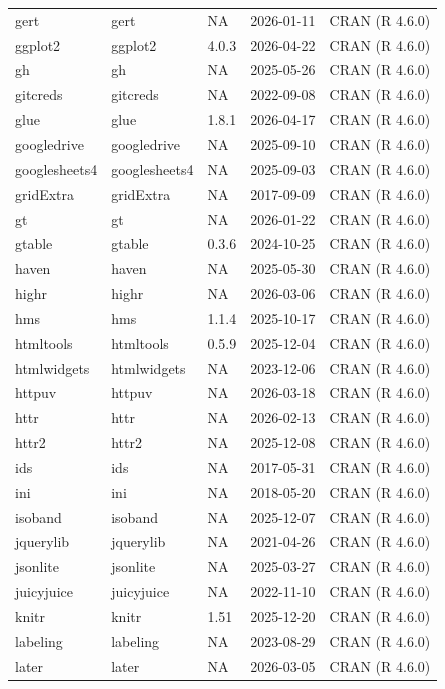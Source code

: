 \documentclass[
]{book}
\begin{document}
\begin{tabular}{lllll}
gert & gert & NA & 2026-01-11 & CRAN (R 4.6.0)\\
ggplot2 & ggplot2 & 4.0.3 & 2026-04-22 & CRAN (R 4.6.0)\\
gh & gh & NA & 2025-05-26 & CRAN (R 4.6.0)\\
\addlinespace
gitcreds & gitcreds & NA & 2022-09-08 & CRAN (R 4.6.0)\\
glue & glue & 1.8.1 & 2026-04-17 & CRAN (R 4.6.0)\\
googledrive & googledrive & NA & 2025-09-10 & CRAN (R 4.6.0)\\
googlesheets4 & googlesheets4 & NA & 2025-09-03 & CRAN (R 4.6.0)\\
gridExtra & gridExtra & NA & 2017-09-09 & CRAN (R 4.6.0)\\
\addlinespace
gt & gt & NA & 2026-01-22 & CRAN (R 4.6.0)\\
gtable & gtable & 0.3.6 & 2024-10-25 & CRAN (R 4.6.0)\\
haven & haven & NA & 2025-05-30 & CRAN (R 4.6.0)\\
highr & highr & NA & 2026-03-06 & CRAN (R 4.6.0)\\
hms & hms & 1.1.4 & 2025-10-17 & CRAN (R 4.6.0)\\
\addlinespace
htmltools & htmltools & 0.5.9 & 2025-12-04 & CRAN (R 4.6.0)\\
htmlwidgets & htmlwidgets & NA & 2023-12-06 & CRAN (R 4.6.0)\\
httpuv & httpuv & NA & 2026-03-18 & CRAN (R 4.6.0)\\
httr & httr & NA & 2026-02-13 & CRAN (R 4.6.0)\\
httr2 & httr2 & NA & 2025-12-08 & CRAN (R 4.6.0)\\
\addlinespace
ids & ids & NA & 2017-05-31 & CRAN (R 4.6.0)\\
ini & ini & NA & 2018-05-20 & CRAN (R 4.6.0)\\
isoband & isoband & NA & 2025-12-07 & CRAN (R 4.6.0)\\
jquerylib & jquerylib & NA & 2021-04-26 & CRAN (R 4.6.0)\\
jsonlite & jsonlite & NA & 2025-03-27 & CRAN (R 4.6.0)\\
\addlinespace
juicyjuice & juicyjuice & NA & 2022-11-10 & CRAN (R 4.6.0)\\
knitr & knitr & 1.51 & 2025-12-20 & CRAN (R 4.6.0)\\
labeling & labeling & NA & 2023-08-29 & CRAN (R 4.6.0)\\
later & later & NA & 2026-03-05 & CRAN (R 4.6.0)\\

\end{tabular}
\end{document}
